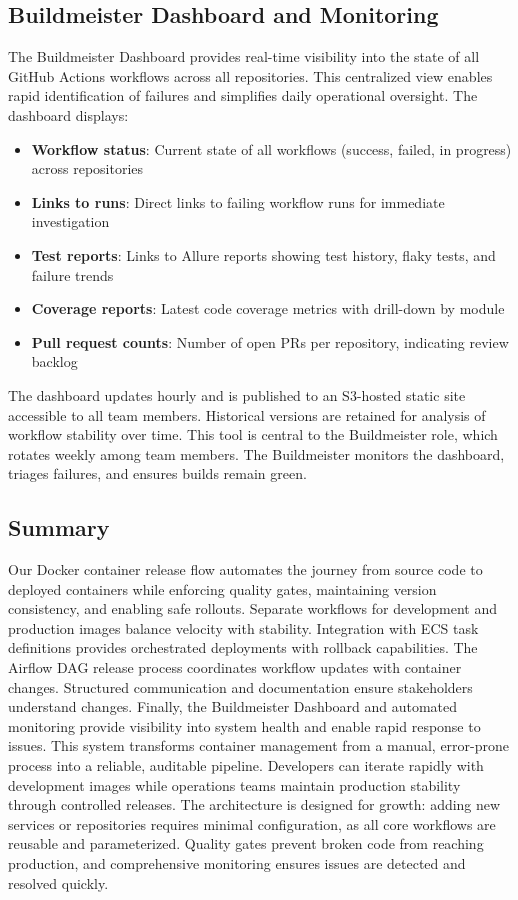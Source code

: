 \subsection{Buildmeister Dashboard and Monitoring}
The Buildmeister Dashboard provides real-time visibility into the
state of all GitHub Actions workflows across all repositories. This centralized
view enables rapid identification of failures and simplifies daily operational
oversight. The dashboard displays:
\begin{itemize}
  \item \textbf{Workflow status}: Current state of all workflows (success,
    failed, in progress) across repositories

  \item \textbf{Links to runs}: Direct links to failing workflow runs for
    immediate investigation

  \item \textbf{Test reports}: Links to Allure reports showing test history,
    flaky tests, and failure trends

  \item \textbf{Coverage reports}: Latest code coverage metrics with drill-down
    by module

  \item \textbf{Pull request counts}: Number of open PRs per repository,
    indicating review backlog
\end{itemize}
The dashboard updates hourly and is published to an S3-hosted static site
accessible to all team members. Historical versions are retained for
analysis of workflow stability over time. This tool is central to the Buildmeister
role, which rotates weekly among team members. The Buildmeister monitors
the dashboard, triages failures, and ensures builds remain green.
\subsection{Summary}
Our Docker container release flow automates the journey from source
code to deployed containers while enforcing quality gates, maintaining
version consistency, and enabling safe rollouts. Separate workflows for
development and production images balance velocity with stability.
Integration with ECS task definitions provides orchestrated
deployments with rollback capabilities. The Airflow DAG release process
coordinates workflow updates with container changes. Structured
communication and documentation ensure stakeholders understand changes.
Finally, the Buildmeister Dashboard and automated monitoring provide
visibility into system health and enable rapid response to issues. This
system transforms container management from a manual, error-prone
process into a reliable, auditable pipeline. Developers can iterate
rapidly with development images while operations teams maintain
production stability through controlled releases. The architecture is designed
for growth: adding new services or repositories requires minimal
configuration, as all core workflows are reusable and parameterized.
Quality gates prevent broken code from reaching production, and comprehensive
monitoring ensures issues are detected and resolved quickly.
